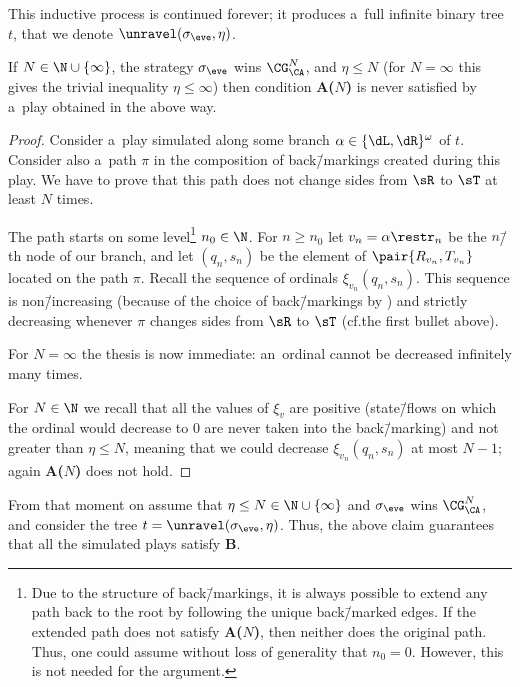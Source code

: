 \documentclass{lmcs}
\numberwithin{equation}{section}
\numberwithin{figure}{section}
\newcommand{\itemfont}[1]{\textbf{#1}}
\begin{document}
This inductive process is continued forever; it produces a~full infinite binary tree $t$, that we denote $\unravel(\sigma_\eve, \eta)$.

\begin{clm}
	If $N\in\N\cup\{\infty\}$, the strategy $\sigma_\eve$ wins $\CG^N_\CA$, and $\eta\leq N$ (for $N=\infty$ this gives the trivial inequality $\eta\leq \infty$)
	then condition \itemfont{A($N$)} is never satisfied by a~play obtained in the above way.
\end{clm}

\begin{proof}
	Consider a~play simulated along some branch $\alpha\in\{\dL,\dR\}^\omega$ of $t$.
	Consider also a~path $\pi$ in the composition of back\=/markings created during this play.
	We have to prove that this path does not change sides from $\sR$ to $\sT$ at least $N$ times.
		
	The path starts on some level\footnote{Due to the structure of back\=/markings, it is always possible to extend any path back to the root by following the unique back\=/marked edges. If the extended path does not satisfy \itemfont{A($N$)}, then neither does the original path. Thus, one could assume without loss of generality that $n_0=0$. However, this is not needed for the argument.} $n_0\in\N$.
	For $n\geq n_0$ let $v_n=\alpha\restr_n$ be the $n$\=/th node of our branch, and let $(q_n,s_n)$ be the element of $\pair{R_{v_n},T_{v_n}}$ located on the path $\pi$.
	Recall the sequence of ordinals $\xi_{v_n}(q_n,s_n)$.
	This sequence is non\=/increasing (because of the choice of back\=/markings by \adam) and strictly decreasing whenever $\pi$ changes sides from $\sR$ to $\sT$ (cf.\@ the first bullet above).
	
	For $N=\infty$ the thesis is now immediate: an~ordinal cannot be decreased infinitely many times.
	
	For $N\in\N$ we recall that all the values of $\xi_v$ are positive (state\=/flows on which the ordinal would decrease to $0$ are never taken into the back\=/marking) and not greater than $\eta\leq N$,
	meaning that we could decrease $\xi_{v_n}(q_n,s_n)$ at most $N{-}1$;
	again \itemfont{A($N$)} does not hold.
\end{proof}

From that moment on assume that $\eta\leq N\in\N\cup\{\infty\}$ and $\sigma_\eve$ wins $\CG^N_\CA$, and consider the tree $t=\unravel(\sigma_\eve,\eta)$.
Thus, the above claim guarantees that all the simulated plays satisfy \itemfont{B}.
\end{document}
